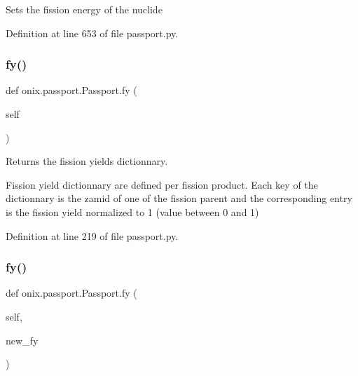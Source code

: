\begin{DoxyVerb}Sets the fission energy of the nuclide\end{DoxyVerb}
 

Definition at line 653 of file passport.\+py.

\mbox{\label{classonix_1_1passport_1_1Passport_a8c1aec4f4e3c394b41bc9a2dc683b38e}} 
\subsubsection{\texorpdfstring{fy()}{fy()}\hspace{0.1cm}{\footnotesize\ttfamily [1/2]}}
{\footnotesize\ttfamily def onix.\+passport.\+Passport.\+fy (\begin{DoxyParamCaption}\item[{}]{self }\end{DoxyParamCaption})}

\begin{DoxyVerb}Returns the fission yields dictionnary.

Fission yield dictionnary are defined per fission product. Each key of the dictionnary is the zamid of one of the 
fission parent and the corresponding entry is the fission yield normalized to 1 (value between 0 and 1)\end{DoxyVerb}
 

Definition at line 219 of file passport.\+py.

\mbox{\label{classonix_1_1passport_1_1Passport_a3b5293faf78c91bf22954edd3e459499}} 
\subsubsection{\texorpdfstring{fy()}{fy()}\hspace{0.1cm}{\footnotesize\ttfamily [2/2]}}
{\footnotesize\ttfamily def onix.\+passport.\+Passport.\+fy (\begin{DoxyParamCaption}\item[{}]{self,  }\item[{}]{new\+\_\+fy }\end{DoxyParamCaption})}

